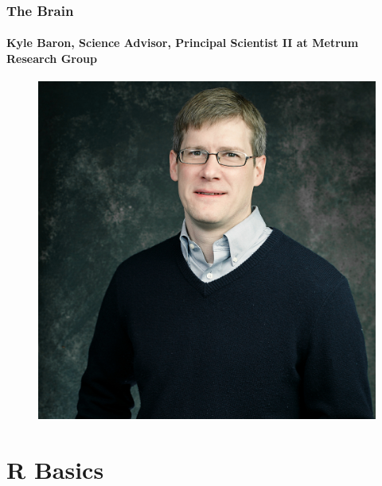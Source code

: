 \documentclass[
	11pt, %
]{beamer}
\begin{document}
\begin{frame}
\frametitle{The Brain}
	\framesubtitle{Kyle Baron, Science Advisor, Principal Scientist II at Metrum Research Group}
\begin{figure}
   \includegraphics[width= 0.55\linewidth]{../Figures/kyle.jpg}
\end{figure}


\end{frame}






\section{R Basics} %

\end{document}
